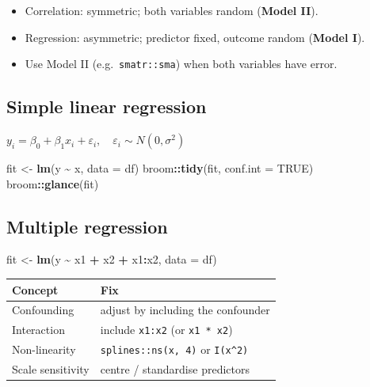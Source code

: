 \documentclass[
]{article}
\newenvironment{Shaded}{\begin{snugshade}}{\end{snugshade}}
\newcommand{\AttributeTok}[1]{\textcolor[rgb]{0.13,0.29,0.53}{#1}}
\newcommand{\ConstantTok}[1]{\textcolor[rgb]{0.56,0.35,0.01}{#1}}
\newcommand{\FunctionTok}[1]{\textcolor[rgb]{0.13,0.29,0.53}{\textbf{#1}}}
\newcommand{\NormalTok}[1]{#1}
\newcommand{\OtherTok}[1]{\textcolor[rgb]{0.56,0.35,0.01}{#1}}
\newcommand{\SpecialCharTok}[1]{\textcolor[rgb]{0.81,0.36,0.00}{\textbf{#1}}}
\newcounter{none} %
\providecommand{\tightlist}{%
  \setlength{\itemsep}{0pt}\setlength{\parskip}{0pt}}
\begin{document}
\begin{itemize}
\tightlist
\item
  Correlation: symmetric; both variables random (\textbf{Model II}).
\item
  Regression: asymmetric; predictor fixed, outcome random (\textbf{Model
  I}).
\item
  Use Model II (e.g.~\texttt{smatr::sma}) when both variables have
  error.
\end{itemize}

\subsection{Simple linear regression}\label{simple-linear-regression}

\(y_i = \beta_0 + \beta_1 x_i + \varepsilon_i, \quad \varepsilon_i \sim N(0, \sigma^2)\)

\begin{Shaded}
\begin{Highlighting}[]
\NormalTok{fit }\OtherTok{\textless{}{-}} \FunctionTok{lm}\NormalTok{(y }\SpecialCharTok{\textasciitilde{}}\NormalTok{ x, }\AttributeTok{data =}\NormalTok{ df)}
\NormalTok{broom}\SpecialCharTok{::}\FunctionTok{tidy}\NormalTok{(fit, }\AttributeTok{conf.int =} \ConstantTok{TRUE}\NormalTok{)}
\NormalTok{broom}\SpecialCharTok{::}\FunctionTok{glance}\NormalTok{(fit)}
\end{Highlighting}
\end{Shaded}

\subsection{Multiple regression}\label{multiple-regression}

\begin{Shaded}
\begin{Highlighting}[]
\NormalTok{fit }\OtherTok{\textless{}{-}} \FunctionTok{lm}\NormalTok{(y }\SpecialCharTok{\textasciitilde{}}\NormalTok{ x1 }\SpecialCharTok{+}\NormalTok{ x2 }\SpecialCharTok{+}\NormalTok{ x1}\SpecialCharTok{:}\NormalTok{x2, }\AttributeTok{data =}\NormalTok{ df)}
\end{Highlighting}
\end{Shaded}

{\def\LTcaptype{none} %
\begin{longtable}[]{@{}ll@{}}
\toprule\noalign{}
Concept & Fix \\
\midrule\noalign{}
\endhead
\bottomrule\noalign{}
\endlastfoot
Confounding & adjust by including the confounder \\
Interaction & include \texttt{x1:x2} (or \texttt{x1\ *\ x2}) \\
Non-linearity & \texttt{splines::ns(x,\ 4)} or \texttt{I(x\^{}2)} \\
Scale sensitivity & centre / standardise predictors \\
\end{longtable}
}
\end{document}
